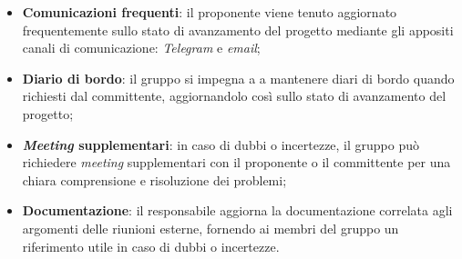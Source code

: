 \begin{itemize}
\begin{itemize}
		      \item \textbf{Comunicazioni frequenti}: il proponente viene tenuto
		            aggiornato frequentemente sullo stato di avanzamento del
		            progetto mediante gli appositi canali di comunicazione:
		            \textit{Telegram} e \textit{email};

		      \item \textbf{Diario di bordo}: il gruppo si impegna a a mantenere 
			  		diari di bordo quando richiesti dal committente, aggiornandolo 
					così sullo stato di avanzamento del progetto;

		      \item \textbf{\textit{Meeting} supplementari}: in caso di dubbi o 
			  		incertezze, il gruppo può richiedere \textit{meeting} supplementari 
					con il proponente o il committente per una chiara comprensione e 
					risoluzione dei problemi;

		      \item \textbf{Documentazione}: il responsabile aggiorna la documentazione 
			  		correlata agli argomenti delle riunioni esterne, fornendo ai membri 
					del gruppo un riferimento utile in caso di dubbi o incertezze.
	      \end{itemize}
\end{itemize}

